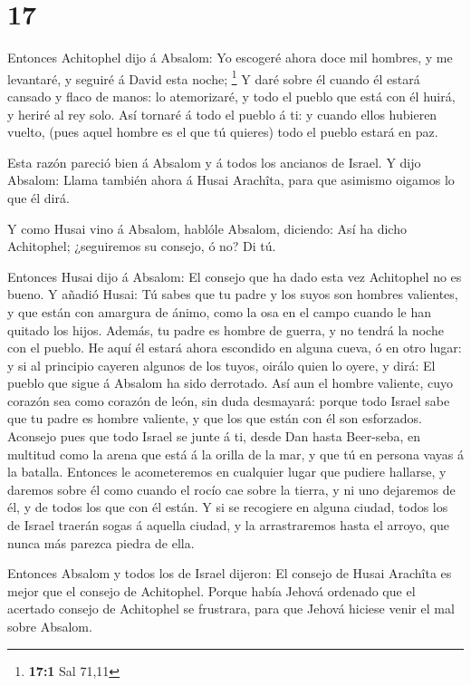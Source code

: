 \hypertarget{section-16}{%
\section{17}\label{section-16}}

 Entonces Achitophel dijo á Absalom: Yo escogeré ahora doce
mil hombres, y me levantaré, y seguiré á David esta noche; \footnote{\textbf{17:1}
  Sal 71,11}  Y daré sobre él cuando él estará cansado y
flaco de manos: lo atemorizaré, y todo el pueblo que está con él huirá,
y heriré al rey solo.  Así tornaré á todo el pueblo á ti: y
cuando ellos hubieren vuelto, (pues aquel hombre es el que tú quieres)
todo el pueblo estará en paz.

 Esta razón pareció bien á Absalom y á todos los ancianos de
Israel.  Y dijo Absalom: Llama también ahora á Husai
Arachîta, para que asimismo oigamos lo que él dirá.

 Y como Husai vino á Absalom, hablóle Absalom, diciendo: Así
ha dicho Achitophel; ¿seguiremos su consejo, ó no? Di tú.

 Entonces Husai dijo á Absalom: El consejo que ha dado esta
vez Achitophel no es bueno.  Y añadió Husai: Tú sabes que tu
padre y los suyos son hombres valientes, y que están con amargura de
ánimo, como la osa en el campo cuando le han quitado los hijos. Además,
tu padre es hombre de guerra, y no tendrá la noche con el pueblo.
 He aquí él estará ahora escondido en alguna cueva, ó en
otro lugar: y si al principio cayeren algunos de los tuyos, oirálo quien
lo oyere, y dirá: El pueblo que sigue á Absalom ha sido derrotado.
 Así aun el hombre valiente, cuyo corazón sea como corazón
de león, sin duda desmayará: porque todo Israel sabe que tu padre es
hombre valiente, y que los que están con él son esforzados.
 Aconsejo pues que todo Israel se junte á ti, desde Dan
hasta Beer-seba, en multitud como la arena que está á la orilla de la
mar, y que tú en persona vayas á la batalla.  Entonces le
acometeremos en cualquier lugar que pudiere hallarse, y daremos sobre él
como cuando el rocío cae sobre la tierra, y ni uno dejaremos de él, y de
todos los que con él están.  Y si se recogiere en alguna
ciudad, todos los de Israel traerán sogas á aquella ciudad, y la
arrastraremos hasta el arroyo, que nunca más parezca piedra de ella.

 Entonces Absalom y todos los de Israel dijeron: El consejo
de Husai Arachîta es mejor que el consejo de Achitophel. Porque había
Jehová ordenado que el acertado consejo de Achitophel se frustrara, para
que Jehová hiciese venir el mal sobre Absalom.

